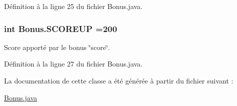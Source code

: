 Définition à la ligne 25 du fichier Bonus.\-java.

\hypertarget{class_bonus_a62d1d7bef5df2d449bc67e1fb1985b5f}{
\subsubsection[{S\-C\-O\-R\-E\-U\-P}]{\setlength{\rightskip}{0pt plus 5cm}int Bonus.\-S\-C\-O\-R\-E\-U\-P =200\hspace{0.3cm}{\ttfamily [static]}}}\label{class_bonus_a62d1d7bef5df2d449bc67e1fb1985b5f}


Score apporté par le bonus \char`\"{}score\char`\"{}. 


\begin{DoxyItemize}
\item 
\end{DoxyItemize}

Définition à la ligne 27 du fichier Bonus.\-java.



La documentation de cette classe a été générée à partir du fichier suivant \-:\begin{DoxyCompactItemize}
\item 
\hyperlink{_bonus_8java}{Bonus.\-java}\end{DoxyCompactItemize}
